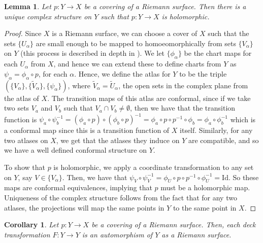 \documentclass[11pt]{report}
\newtheorem{lemma}[thm]{Lemma}
\newtheorem{cor}[thm]{Corollary}
\theoremstyle{definition}
\begin{document}
\begin{lemma}
  Let $p:Y \rightarrow X$ be a covering of a Riemann surface. Then there is a unique complex structure on $Y$ such that $p:Y \rightarrow X$ is holomorphic.
\end{lemma}
\begin{proof}
  Since $X$ is a Riemann surface, we can choose a cover of $X$ such that the sets $\{U_{\alpha}\}$ are small enough to be mapped to homoeomorphically from sets $\{V_{\alpha}\}$ on $Y$ (this process is described in depth in \cite[Theorem 4.11.2]{comfun}). We let $\{\phi_{\alpha}\}$ be the chart maps for each $U_{\alpha}$ from $X$, and hence we can extend these to define charts from $Y$ as $\psi_{\alpha} = \phi_{\alpha} \circ p$, for each $\alpha$. Hence, we define the atlas for $Y$ to be the triple $(\{V_{\alpha}\},\{\tilde{V}_{\alpha}\},\{\psi_{\alpha}\})$, where $\tilde{V}_{\alpha} = \tilde{U}_{\alpha}$, the open sets in the complex plane from the atlas of $X$. The transition maps of this atlas are conformal, since if we take two sets $V_a$ and $V_b$ such that $V_a \cap V_b \neq \emptyset$, then we have that the transition function is $\psi_{a}\circ\psi_{b}^{-1} = (\phi_{a}\circ p)\circ (\phi_{b} \circ p)^{-1} = \phi_{a}\circ p \circ p^{-1}\circ \phi_{b}=\phi_{a}\circ\phi_b^{-1}$ which is a conformal map since this is a transition function of $X$ itself. Similarly, for any two atlases on $X$, we get that the atlases they induce on $Y$ are compatible, and so we have a well defined conformal structure on $Y$. 

  To show that $p$ is holomorphic, we apply a coordinate transformation to any set on $Y$, say $V\in \{V_{\alpha}\}$. Then, we have that $\psi_{V} \circ \psi_{V}^{-1} = \phi_{U}\circ p\circ p^{-1}\circ \phi_{U}^{-1} = \text{Id}$. So these maps are conformal equivalences, implying that $p$ must be a holomorphic map. Uniqueness of the complex structure follows from the fact that for any two atlases, the projections will map the same points in $Y$ to the same point in $X$.
\end{proof}
\begin{cor}
  Let $p:Y \rightarrow X$ be a covering of a Riemann surface. Then, each deck  transformation $F:Y \rightarrow Y$ is an automorphism of $Y$ as a Riemann surface.
\end{cor}
\end{document}
